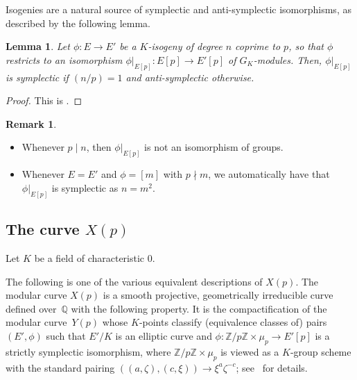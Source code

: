 \documentclass[12pt]{amsart}
\numberwithin{equation}{section}
\newtheorem{lemma}[equation]{Lemma}
\theoremstyle{definition}
\newtheorem{remark}[equation]{Remark}
\newcommand{\Q}{\mathbb{Q}}
\newcommand{\Z}{\mathbb{Z}}
\begin{document}
Isogenies are a natural source of symplectic and anti-symplectic isomorphisms, as described by the following lemma.

\begin{lemma}\label{lem:isogeny}
		Let $\phi: E \to E'$ be a $K$-isogeny of degree $n$ coprime to $p$, so that $\phi$ restricts to an isomorphism $\phi|_{E[p]} : E[p] \to E'[p]$ of $G_K$-modules. Then, $\phi|_{E[p]}$ is symplectic if $(n/p) = 1$ and anti-symplectic otherwise.
	\end{lemma}
  \begin{proof} This is \cite[Corollary~1]{symplectic}.
  \end{proof}
\begin{remark}\label{rmk:multiplication-isog} 
    \begin{itemize}
        \item[1.] Whenever $p\mid n$, then $\phi|_{E[p]}$ is not an isomorphism of groups.
        \item[2.] Whenever $E=E'$ and $\phi=[m]$ with $p\nmid m$, we automatically have that $\phi|_{E[p]}$ is symplectic as $n=m^2$.
    \end{itemize}
\end{remark}

\subsection{The curve \texorpdfstring{$X(p)$}{}}\label{sec:Xp}
Let $K$ be a field of characteristic $0$.

The following is one of the various equivalent descriptions of $X(p)$.
The modular curve $X(p)$ is a smooth projective, geometrically irreducible curve defined
over~$\Q$ with the following property. It is the compactification of the
modular curve~$Y(p)$ whose $K$-points classify
(equivalence classes of) pairs $(E', \phi)$ such that $E'/K$ is an elliptic curve and
$\phi : \Z/p\Z \times \mu_p \to E'[p]$ is a strictly symplectic isomorphism,
where $\Z/p\Z \times \mu_p$ is viewed as a $K$-group scheme with the standard pairing
$((a,\zeta),(c,\xi)) \to \xi^a \zeta^{-c}$; see~\cite[\S 1.5.3.4]{Halberstadt} for details. 
\end{document}
